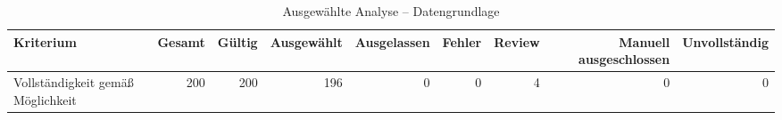 \begin{table}[htbp]
\centering
\caption{Ausgewählte Analyse -- Datengrundlage}
\begin{tabular}{lrrrrrrrr}
\toprule
Kriterium & Gesamt & Gültig & Ausgewählt & Ausgelassen & Fehler & Review & Manuell ausgeschlossen & Unvollständig \\
\midrule
Vollständigkeit gemäß Möglichkeit & 200 & 200 & 196 & 0 & 0 & 4 & 0 & 0 \\
\bottomrule
\end{tabular}
\end{table}
